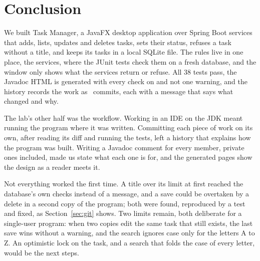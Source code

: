 \section{Conclusion}\label{sec:conclusion}

We built Task Manager, a JavaFX desktop application over Spring Boot services that adds, lists, updates and deletes
tasks, sets their status, refuses a task without a title, and keeps its tasks in a local SQLite file. The rules live
in one place, the services, where the JUnit tests check them on a fresh database, and the window only shows what the
services return or refuse. All 38 tests pass, the Javadoc HTML is generated with every check on and not one warning,
and the history records the work as \CommitCount\ commits, each with a message that says what changed and why.

The lab's other half was the workflow. Working in an IDE on the JDK meant running the program where it
was written. Committing each piece of work on its own, after reading its diff and running the tests, left a history
that explains how the program was built. Writing a Javadoc comment for every member, private ones included, made us
state what each one is for, and the generated pages show the design as a reader meets it.

Not everything worked the first time. A title over its limit at first reached the database's own checks instead of a
message, and a save could be overtaken by a delete in a second copy of the program; both were found, reproduced by a
test and fixed, as Section~\ref{sec:git} shows. Two limits remain, both deliberate for a single-user program: when two
copies edit the same task that still exists, the last save wins without a warning, and the search ignores case only
for the letters A to Z. An optimistic lock on the task, and a search that folds the case of every letter, would be the
next steps.
